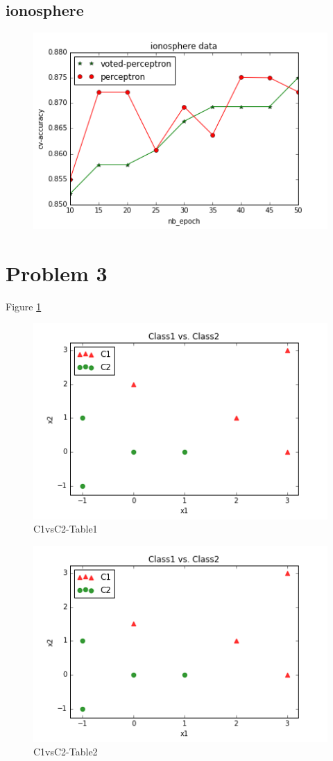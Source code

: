 \documentclass[10pt,a4paper]{article}
\begin{document}
\subsection{ionosphere}
\graphicspath{ {/images/} }
\begin{figure}[!h]
\includegraphics[scale=0.75]{images/ionosphere_result.png}	
\end{figure}
\clearpage


\section{Problem 3}
Figure \ref{fig:C12T1}
\graphicspath{ {/images/} }
\begin{figure}[!h]
\includegraphics[scale=0.75]{images/C1vsC2_Table1.png}
  \caption{C1vsC2-Table1}
  \label{fig:C12T1}
\end{figure}

\graphicspath{ {/images/} }
\begin{figure}[!h]
\includegraphics[scale=0.75]{images/C3vsC4_Table2.png}	
  \caption{C1vsC2-Table2}
  \label{fig:C34T2}
\end{figure}
\end{document}
